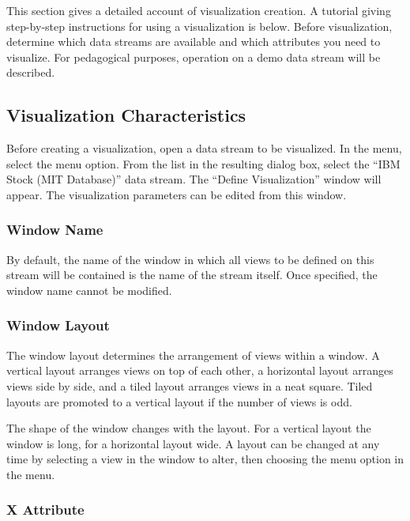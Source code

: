 This section gives a detailed account of visualization creation. A tutorial
giving step-by-step instructions for using a visualization is below. Before
visualization, determine which data streams are available and which attributes
you need to visualize. For pedagogical purposes, operation on a demo data
stream will be described.


\subsection{Visualization Characteristics}

Before creating a visualization, open a data stream to be visualized. In the
 menu, select the  menu option. From the list in the
resulting dialog box, select the ``IBM Stock (MIT Database)'' data stream. The
``Define Visualization'' window will appear. The visualization parameters can be
edited from this window.

\subsubsection{Window Name}

By default, the name of the window in which all views to be defined on this
stream will be contained is the name of the stream itself. Once specified, the
window name cannot be modified.

\subsubsection{Window Layout}

The window layout determines the arrangement of views within a window. A
vertical layout arranges views on top of each other, a horizontal layout
arranges views side by side, and a tiled layout arranges views in a neat
square. Tiled layouts are promoted to a vertical layout if the number
of views is odd.

The shape of the window changes with the layout. For a vertical layout the
window is long, for a horizontal layout wide. A layout can be changed at any
time by selecting a view in the window to alter, then choosing the 
menu option in the  menu.

\subsubsection{X Attribute}

